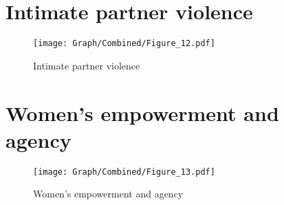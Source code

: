 \documentclass[10pt,a4paper]{article}
\begin{document}
\section{Intimate partner violence}
\begin{table}[H]\centering

\end{table}
\begin{figure}[H]\centering
\texttt{[image: Graph/Combined/Figure\_12.pdf]}
\caption{Intimate partner violence} \label{fig:Fig_12}
\end{figure}
\begin{table}[H]\centering

\end{table}
\pagebreak
\section{Women's empowerment and agency}
\begin{table}[H]\centering

\end{table}
\begin{figure}[H]\centering
\texttt{[image: Graph/Combined/Figure\_13.pdf]}
\caption{Women's empowerment and agency} \label{fig:Fig_13}
\end{figure}
\begin{table}[H]\centering

\end{table}
\pagebreak
\end{document}
